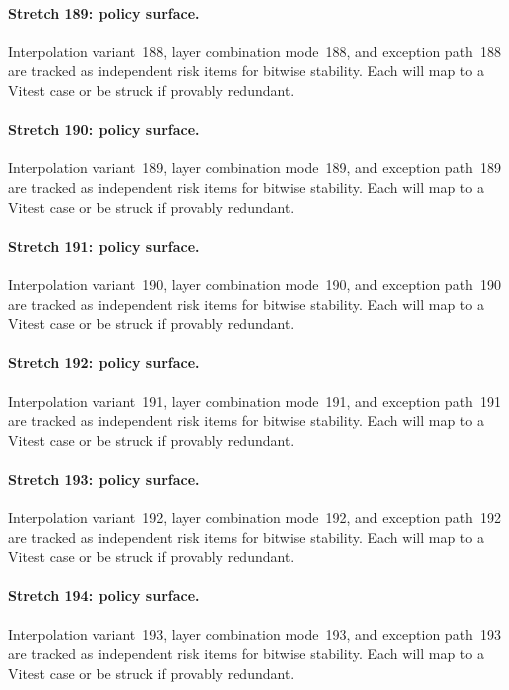 \documentclass[sigconf,nonacm]{acmart}
\begin{document}
\paragraph{Stretch 189: policy surface.}
Interpolation variant~188, layer combination mode~188, and exception path~188 are tracked as independent risk items for bitwise stability. Each will map to a Vitest case or be struck if provably redundant. %

\paragraph{Stretch 190: policy surface.}
Interpolation variant~189, layer combination mode~189, and exception path~189 are tracked as independent risk items for bitwise stability. Each will map to a Vitest case or be struck if provably redundant. %

\paragraph{Stretch 191: policy surface.}
Interpolation variant~190, layer combination mode~190, and exception path~190 are tracked as independent risk items for bitwise stability. Each will map to a Vitest case or be struck if provably redundant. %

\paragraph{Stretch 192: policy surface.}
Interpolation variant~191, layer combination mode~191, and exception path~191 are tracked as independent risk items for bitwise stability. Each will map to a Vitest case or be struck if provably redundant. %

\paragraph{Stretch 193: policy surface.}
Interpolation variant~192, layer combination mode~192, and exception path~192 are tracked as independent risk items for bitwise stability. Each will map to a Vitest case or be struck if provably redundant. %

\paragraph{Stretch 194: policy surface.}
Interpolation variant~193, layer combination mode~193, and exception path~193 are tracked as independent risk items for bitwise stability. Each will map to a Vitest case or be struck if provably redundant. %
\end{document}
